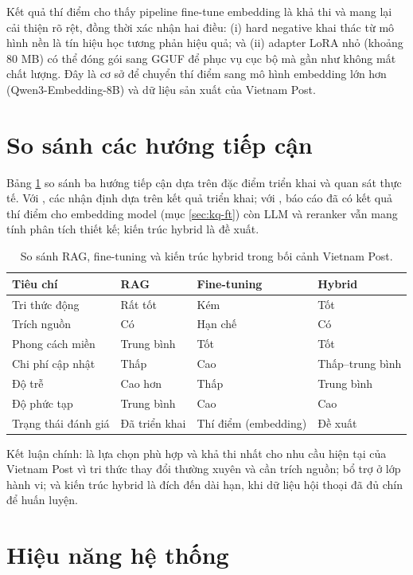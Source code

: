 Kết quả thí điểm cho thấy pipeline fine-tune embedding là khả thi và mang lại cải thiện rõ
rệt, đồng thời xác nhận hai điều: (i) hard negative khai thác từ mô hình nền là tín hiệu học
tương phản hiệu quả; và (ii) adapter LoRA nhỏ (khoảng 80 MB) có thể đóng gói sang GGUF để
phục vụ cục bộ mà gần như không mất chất lượng. Đây là cơ sở để chuyển thí điểm sang mô hình
embedding lớn hơn (Qwen3-Embedding-8B) và dữ liệu sản xuất của Vietnam Post.

\section{So sánh các hướng tiếp cận}
\label{sec:ss}

Bảng \ref{tab:ss} so sánh ba hướng tiếp cận dựa trên đặc điểm triển khai và quan sát thực
tế. Với \rag, các nhận định dựa trên kết quả triển khai; với \ft, báo cáo đã có kết quả thí
điểm cho embedding model (mục \ref{sec:kq-ft}) còn LLM và reranker vẫn mang tính phân tích
thiết kế; kiến trúc hybrid là đề xuất.

\begin{table}[htbp]
\centering
\caption{So sánh RAG, fine-tuning và kiến trúc hybrid trong bối cảnh Vietnam Post.}
\label{tab:ss}
\small
\begin{tabular}{@{}p{3.4cm}p{3.9cm}p{3.6cm}p{3.6cm}@{}}
\toprule
\textbf{Tiêu chí} & \textbf{RAG} & \textbf{Fine-tuning} & \textbf{Hybrid} \\
\midrule
Tri thức động & Rất tốt & Kém & Tốt \\
Trích nguồn & Có & Hạn chế & Có \\
Phong cách miền & Trung bình & Tốt & Tốt \\
Chi phí cập nhật & Thấp & Cao & Thấp--trung bình \\
Độ trễ & Cao hơn & Thấp & Trung bình \\
Độ phức tạp & Trung bình & Cao & Cao \\
Trạng thái đánh giá & Đã triển khai & Thí điểm (embedding) & Đề xuất \\
\bottomrule
\end{tabular}
\end{table}

Kết luận chính: \rag{} là lựa chọn phù hợp và khả thi nhất cho nhu cầu hiện tại của Vietnam Post
vì tri thức thay đổi thường xuyên và cần trích nguồn; \ft{} bổ trợ ở lớp hành vi; và kiến
trúc hybrid là đích đến dài hạn, khi dữ liệu hội thoại đã đủ chín để huấn luyện.

\section{Hiệu năng hệ thống}
\label{sec:hieunang}

